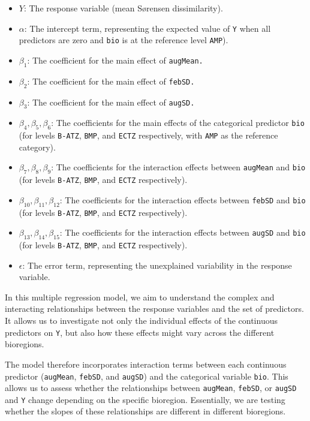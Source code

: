 \documentclass[
  letterpaper,
]{book}
\providecommand{\tightlist}{%
  \setlength{\itemsep}{0pt}\setlength{\parskip}{0pt}}\usepackage{longtable,booktabs,array}
\begin{document}
\begin{itemize}
\tightlist
\item
  \(Y\): The response variable (mean Sørensen dissimilarity).
\item
  \(\alpha\): The intercept term, representing the expected value of
  \texttt{Y} when all predictors are zero and \texttt{bio} is at the
  reference level \texttt{AMP}).
\item
  \(\beta_1\): The coefficient for the main effect of \texttt{augMean.}
\item
  \(\beta_2\): The coefficient for the main effect of \texttt{febSD.}
\item
  \(\beta_3\): The coefficient for the main effect of \texttt{augSD.}
\item
  \(\beta_4, \beta_5, \beta_6\): The coefficients for the main effects
  of the categorical predictor \texttt{bio} (for levels \texttt{B-ATZ},
  \texttt{BMP}, and \texttt{ECTZ} respectively, with \texttt{AMP} as the
  reference category).
\item
  \(\beta_7, \beta_8, \beta_9\): The coefficients for the interaction
  effects between \texttt{augMean} and \texttt{bio} (for levels
  \texttt{B-ATZ}, \texttt{BMP}, and \texttt{ECTZ} respectively).
\item
  \(\beta_{10}, \beta_{11}, \beta_{12}\): The coefficients for the
  interaction effects between \texttt{febSD} and \texttt{bio} (for
  levels \texttt{B-ATZ}, \texttt{BMP}, and \texttt{ECTZ} respectively).
\item
  \(\beta_{13}, \beta_{14}, \beta_{15}\): The coefficients for the
  interaction effects between \texttt{augSD} and \texttt{bio} (for
  levels \texttt{B-ATZ}, \texttt{BMP}, and \texttt{ECTZ} respectively).
\item
  \(\epsilon\): The error term, representing the unexplained variability
  in the response variable.
\end{itemize}

In this multiple regression model, we aim to understand the complex and
interacting relationships between the response variables and the set of
predictors. It allows us to investigate not only the individual effects
of the continuous predictors on \texttt{Y}, but also how these effects
might vary across the different bioregions.

The model therefore incorporates interaction terms between each
continuous predictor (\texttt{augMean}, \texttt{febSD}, and
\texttt{augSD}) and the categorical variable \texttt{bio}. This allows
us to assess whether the relationships between \texttt{augMean},
\texttt{febSD}, or \texttt{augSD} and \texttt{Y} change depending on the
specific bioregion. Essentially, we are testing whether the slopes of
these relationships are different in different bioregions.
\end{document}
